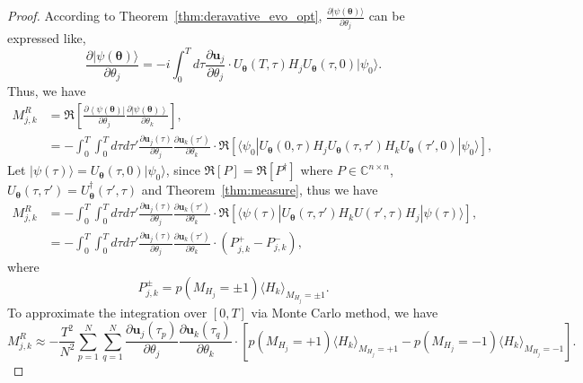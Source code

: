 \documentclass[twocolumn,
pra,aps,superscriptaddress,showpacs,amsmath,amssymb]{revtex4-2}
\begin{document}
\begin{proof}
According to Theorem~\ref{thm:deravative_evo_opt}, $\frac{\partial{|\psi(\bm{\theta})\rangle}}{\partial{\theta_j}}$ can be expressed like,
\begin{equation}
\frac{\partial{|\psi(\bm{\theta})}\rangle}{\partial{\theta_j}} = -i\int_{0}^T
d\tau \frac{\partial{\bm{u}_j}}{\partial{\theta_j}} \cdot U_{\bm{\theta}}(T,\tau) H_j U_{\bm{\theta}}(\tau,0) |\psi_0\rangle.
\end{equation}
Thus, we have 
\begin{align}
M_{j,k}^R  &=  \Re\left[\frac{\partial\left<\psi(\bm{\theta})\right|}{\partial\theta_j}\frac{\partial\left|\psi(\bm{\theta})\right>}{\partial\theta_k}\right],\\
& = - \int_{0}^T\int_{0}^T d\tau d\tau' \frac{\partial{\bm{u}_j}(\tau)}{\partial{\theta_j}}\frac{\partial{\bm{u}_k}(\tau')}{\partial{\theta_k}} \cdot \Re\left[ \langle \psi_0| U_{\bm{\theta}}(0,\tau)H_j U_{\bm{\theta}}(\tau,\tau')H_k U_{\bm{\theta}}(\tau',0)|\psi_0\rangle \right],
\end{align}
Let $|\psi(\tau)\rangle = U_{\bm{\theta}}(\tau,0)|\psi_0\rangle$, since $\Re[P] = \Re[P^\dagger]$ where $P\in \mathbb{C}^{n\times n}$, $U_{\bm{\theta}}(\tau,\tau') = U_{\bm{\theta}}^{\dagger}(\tau',\tau)$ and Theorem~\ref{thm:measure}, thus we have
\begin{align}
M_{j,k}^R  &= - \int_{0}^T\int_{0}^T d\tau d\tau' \frac{\partial{\bm{u}_j}(\tau)}{\partial{\theta_j}}\frac{\partial{\bm{u}_k}(\tau')}{\partial{\theta_k}} \cdot \Re\left[ \langle \psi(\tau)|U_{\bm{\theta}}(\tau,\tau')H_k U(\tau',\tau)H_j|\psi(\tau)\rangle \right],\\
& = - \int_{0}^T\int_{0}^T d\tau d\tau' \frac{\partial{\bm{u}_j}(\tau)}{\partial{\theta_j}}\frac{\partial{\bm{u}_k}(\tau')}{\partial{\theta_k}} \cdot \left( P_{j,k}^{+} - P_{j,k}^{-}\right),
\end{align}
where 
\begin{equation}
P_{j,k}^{\pm} =  p(M_{H_j}=\pm 1)\langle H_k\rangle_{M_{H_j}=\pm 1}.
\end{equation}
To approximate the integration over $[0,T]$ via Monte Carlo method, we have
\begin{equation}
M_{j,k}^R \approx -\frac{T^2}{N^2}\sum_{p=1}^N\sum_{q=1}^N \frac{\partial{\bm{u}_j}(\tau_p)}{\partial{\theta_j}}\frac{\partial{\bm{u}_k}(\tau_q)}{\partial{\theta_k}}\cdot \left[p(M_{H_j}=+1)\langle H_k\rangle_{M_{H_j}=+1}-p(M_{H_j}=-1)\langle H_k\rangle_{M_{H_j}=-1}\right].
\end{equation}
\end{proof}
\end{document}
